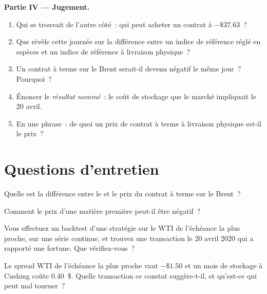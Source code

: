 \begin{problem}
\medskip\noindent\textbf{Partie IV --- Jugement.}
\begin{enumerate}[resume]
\item Qui se trouvait de l'autre côté~: qui peut acheter un contrat à $-\$37.63$~?
\item Que révèle cette journée sur la différence entre un indice de référence réglé en espèces et un
indice de référence à livraison physique~?
\item Un contrat à terme sur le Brent serait-il devenu négatif le même jour~? Pourquoi~?
\item Énoncer le \emph{résultat nommé}~: le coût de stockage que le marché impliquait le 20 avril.
\item En une phrase~: de quoi un prix de contrat à terme à livraison physique est-il le prix~?
\end{enumerate}
\end{problem}

\section{Questions d'entretien}

\begin{interviewq}\label{iq:m3:crude-oil:1}
Quelle est la différence entre le  et le prix du contrat à terme sur le Brent~?
\end{interviewq}

\begin{interviewq}\label{iq:m3:crude-oil:2}
Comment le prix d'une matière première peut-il être négatif~?
\end{interviewq}

\begin{interviewq}\label{iq:m3:crude-oil:3}
Vous effectuez un backtest d'une stratégie sur le WTI de l'échéance la plus proche, sur une série continue, et trouvez une transaction le 20
avril 2020 qui a rapporté une fortune. Que vérifiez-vous~?
\end{interviewq}

\begin{interviewq}\label{iq:m3:crude-oil:4}
Le spread WTI de l'échéance la plus proche vaut $-\$1.50$ et un mois de stockage à Cushing coûte 0.40~\$. Quelle
transaction ce constat suggère-t-il, et qu'est-ce qui peut mal tourner~?
\end{interviewq}

